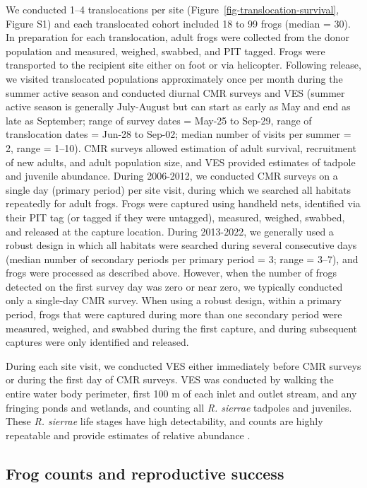 \documentclass[9pt,twocolumn,twoside,lineno]{pnas-new}
\begin{document}
{We conducted 1--4 translocations per site
(Figure~\ref{fig-translocation-survival}, Figure S1)
and each translocated cohort included 18 to 99 frogs (median = 30). In
preparation for each translocation, adult frogs were collected from the
donor population and measured, weighed, swabbed, and PIT tagged. Frogs
were transported to the recipient site either on foot or via helicopter.
Following release, we visited translocated populations approximately
once per month during the summer active season and conducted diurnal CMR
surveys and VES (summer active season is generally July-August but can
start as early as May and end as late as September; range of survey
dates = May-25 to Sep-29, range of translocation dates = Jun-28 to
Sep-02; median number of visits per summer = 2, range = 1--10). CMR
surveys allowed estimation of adult survival, recruitment of new adults,
and adult population size, and VES provided estimates of tadpole and
juvenile abundance. During 2006-2012, we conducted CMR surveys on a
single day (primary period) per site visit, during which we searched all
habitats repeatedly for adult frogs. Frogs were captured using handheld
nets, identified via their PIT tag (or tagged if they were untagged),
measured, weighed, swabbed, and released at the capture location. During
2013-2022, we generally used a robust design in which all habitats were
searched during several consecutive days (median number of secondary
periods per primary period = 3; range = 3--7), and frogs were processed
as described above. However, when the number of frogs detected on the
first survey day was zero or near zero, we typically conducted only a
single-day CMR survey. When using a robust design, within a primary
period, frogs that were captured during more than one secondary period
were measured, weighed, and swabbed during the first capture, and during
subsequent captures were only identified and released.

During each site visit, we conducted VES either immediately before CMR
surveys or during the first day of CMR surveys. VES was conducted by
walking the entire water body perimeter, first 100 m of each inlet and
outlet stream, and any fringing ponds and wetlands, and counting all
\emph{R. sierrae} tadpoles and juveniles. These \emph{R. sierrae} life
stages have high detectability, and counts are highly repeatable and
provide estimates of relative abundance \citep{knapp2000}.

\hypertarget{frog-counts-and-reproductive-success}{%
\subsection*{Frog counts and reproductive
success}\label{frog-counts-and-reproductive-success}}

}
\end{document}
